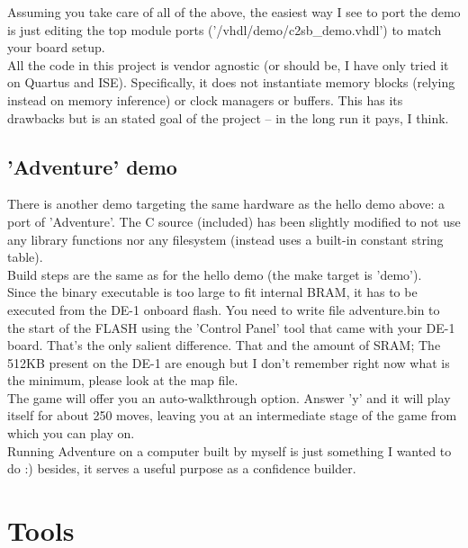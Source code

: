 \documentclass[11pt]{article}
\begin{document}
    Assuming you take care of all of the above, the easiest way I see to port
    the demo is just editing the top module ports ('/vhdl/demo/c2sb\_demo.vhdl')
    to match your board setup.\\

    All the code in this project is vendor agnostic (or should be, I have only
    tried it on Quartus and ISE). Specifically, it does not instantiate memory
    blocks (relying instead on memory inference) or clock managers or buffers.
    This has its drawbacks but is an stated goal of the project -- in the long
    run it pays, I think.\\
    
\subsection{'Adventure' demo}
\label{adventure}

    There is another demo targeting the same hardware as the hello demo above:
    a port of 'Adventure'. The C source (included) has been slightly modified
    to not use any library functions nor any filesystem (instead uses a built-in
    constant string table).\\
    
    Build steps are the same as for the hello demo (the make target is 'demo').\\
    
    Since the binary executable is too large to fit internal BRAM, it has to be 
    executed from the DE-1 onboard flash. You need to write file adventure.bin
    to the start of the FLASH using the 'Control Panel' tool that came with your
    DE-1 board. That's the only salient difference. That and the amount of SRAM;
    The 512KB present on the DE-1 are enough but I don't remember right now
    what is the minimum, please look at the map file.\\
    
    The game will offer you an auto-walkthrough option. Answer 'y' and it will
    play itself for about 250 moves, leaving you at an intermediate stage of 
    the game from which you can play on.\\
    
    Running Adventure on a computer built by myself is just something I wanted 
    to do :) besides, it serves a useful purpose as a confidence builder.\\

    
\section{Tools}
\label{tools}
\end{document}
